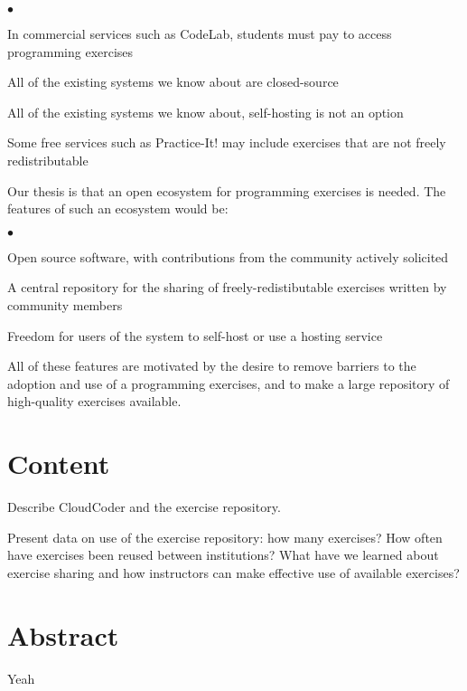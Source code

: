 \documentclass[11pt]{article}
\newenvironment{denseItemize}{%
\begin{list}{$\bullet$}{\setlength{\itemsep}{0in}\setlength{\parsep}{.05in}}}{\end{list}}
\begin{document}
\begin{denseItemize}
\item In commercial services such as CodeLab,
      students must pay to access programming exercises
\item All of the existing systems we know about are closed-source
\item All of the existing systems we know about,
      self-hosting is not an option
\item Some free services such as Practice-It! may include
      exercises that are not freely redistributable
\end{denseItemize}

Our thesis is that an open ecosystem for programming exercises
is needed.  The features of such an ecosystem would be:

\begin{denseItemize}
\item Open source software, with contributions from the community
      actively solicited
\item A central repository for the sharing of freely-redistibutable exercises
      written by community members
\item Freedom for users of the system to self-host or use a hosting service
\end{denseItemize}

All of these features are motivated by the desire to remove 
barriers to the adoption and use of a programming exercises,
and to make a large repository of high-quality exercises available.


\section*{Content}

Describe CloudCoder and the exercise repository.

Present data on use of the exercise repository: how many exercises? How often have exercises
been reused between institutions?  What have we learned about exercise sharing and how
instructors can make effective use of available exercises?

\section*{Abstract}

Yeah
\end{document}
